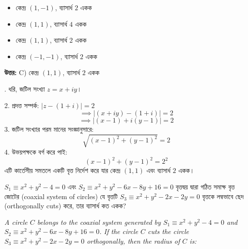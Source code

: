 \documentclass[12pt, a4paper]{article}
\begin{document}
\begin{itemize}[label={}, leftmargin=1cm, itemsep=0.5em]
    \item[\textbf{A)}] কেন্দ্র $(1, -1)$, ব্যাসার্ধ $2$ একক
    \item[\textbf{B)}] কেন্দ্র $(1, 1)$, ব্যাসার্ধ $4$ একক
    \item[\textbf{C)}] কেন্দ্র $(1, 1)$, ব্যাসার্ধ $2$ একক
    \item[\textbf{D)}] কেন্দ্র $(-1, -1)$, ব্যাসার্ধ $2$ একক
\end{itemize}

\vspace{0.5em}
\begin{tcolorbox}[answerbox]
    \textbf{\color{success} উত্তর:} C) কেন্দ্র $(1, 1)$, ব্যাসার্ধ $2$ একক
\end{tcolorbox}
\vspace{1em}

\begin{tcolorbox}[solutionbox={সমাধান (Solution)}]
    . ধরি, জটিল সংখ্যা $z = x + iy$।
    
    \vspace{0.5em}
    2. প্রদত্ত সম্পর্ক: $|z - (1 + i)| = 2$
    \[ \implies |(x + iy) - (1 + i)| = 2 \]
    \[ \implies |(x - 1) + i(y - 1)| = 2 \]
    3. জটিল সংখ্যার পরম মানের সংজ্ঞানুসারে:
    \[ \sqrt{(x - 1)^2 + (y - 1)^2} = 2 \]
    4. উভয়পক্ষকে বর্গ করে পাই:
    \[ (x - 1)^2 + (y - 1)^2 = 2^2 \]
    এটি কার্তেসীয় সমতলে একটি বৃত্ত নির্দেশ করে যার কেন্দ্র $(1, 1)$ এবং ব্যাসার্ধ $2$ একক।
\end{tcolorbox}

\begin{tcolorbox}[questionbox={প্রশ্ন (Question) 22}]
    \noindent
    $S_1 \equiv x^2 + y^2 - 4 = 0$ এবং $S_2 \equiv x^2 + y^2 - 6x - 8y + 16 = 0$ বৃত্তদ্বয় দ্বারা গঠিত সমাক্ষ বৃত্ত জোটের (coaxial system of circles) যে বৃত্তটি $S_3 \equiv x^2 + y^2 - 2x - 2y = 0$ বৃত্তকে লম্বভাবে ছেদ (orthogonally cuts) করে, তার ব্যাসার্ধ কত একক?
    
    \vspace{0.8em}
    \begin{english}
    \noindent\textit{\color{darkgray}
    A circle $C$ belongs to the coaxial system generated by $S_1 \equiv x^2 + y^2 - 4 = 0$ and $S_2 \equiv x^2 + y^2 - 6x - 8y + 16 = 0$. If the circle $C$ cuts the circle $S_3 \equiv x^2 + y^2 - 2x - 2y = 0$ orthogonally, then the radius of $C$ is:
    }
    \end{english}
\end{tcolorbox}
\end{document}
